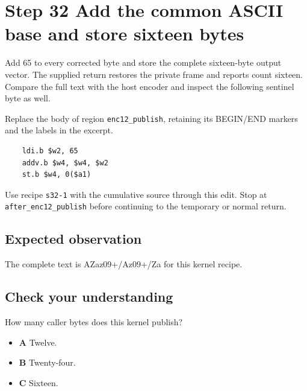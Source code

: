\section{Step 32 Add the common ASCII base and store sixteen bytes}\label{base64-s32}

Add 65 to every corrected byte and store the complete sixteen-byte output vector. The supplied return restores the private frame and reports count sixteen. Compare the full text with the host encoder and inspect the following sentinel byte as well.

Replace the body of region \texttt{enc12\_publish}, retaining its BEGIN/END markers and the labels in the excerpt.

\begin{verbatim}
    ldi.b $w2, 65
    addv.b $w4, $w4, $w2
    st.b $w4, 0($a1)
\end{verbatim}

Use recipe \texttt{s32-1} with the cumulative source through this edit. Stop at \texttt{after\_enc12\_publish} before continuing to the temporary or normal return.

\subsection{Expected observation}
The complete text is AZaz09+/Az09+/Za for this kernel recipe.

\subsection{Check your understanding}
How many caller bytes does this kernel publish?

\begin{itemize}
  \item \textbf{A} Twelve.
  \item \textbf{B} Twenty-four.
  \item \textbf{C} Sixteen.
\end{itemize}
